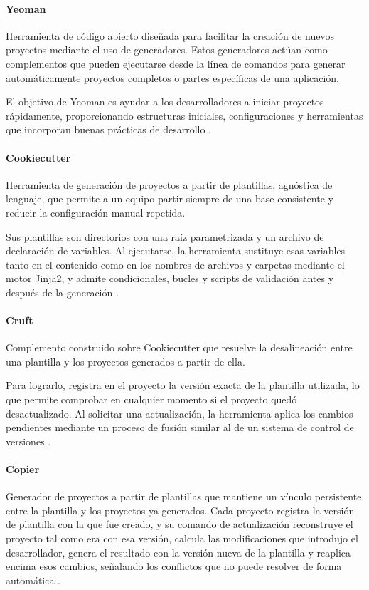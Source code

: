 \paragraph*{Yeoman}
Herramienta de código abierto diseñada para facilitar la creación de nuevos proyectos mediante el uso de generadores. Estos generadores actúan como complementos que pueden ejecutarse desde la línea de comandos para generar automáticamente proyectos completos o partes específicas de una aplicación.

El objetivo de Yeoman es ayudar a los desarrolladores a iniciar proyectos rápidamente, proporcionando estructuras iniciales, configuraciones y herramientas que incorporan buenas prácticas de desarrollo \citep{yeoman-2026}.
\paragraph*{Cookiecutter}
Herramienta de generación de proyectos a partir de plantillas, agnóstica de lenguaje, que permite a un equipo partir siempre de una base consistente y reducir la configuración manual repetida. 
    
Sus plantillas son directorios con una raíz parametrizada y un archivo de declaración de variables. Al ejecutarse, la herramienta sustituye esas variables tanto en el contenido como en los nombres de archivos y carpetas mediante el motor Jinja2, y admite condicionales, bucles y scripts de validación antes y después de la generación \citep{cookiecutter-2023}.
\paragraph*{Cruft}
Complemento construido sobre Cookiecutter que resuelve la desalineación entre una plantilla y los proyectos generados a partir de ella.
    
Para lograrlo, registra en el proyecto la versión exacta de la plantilla utilizada, lo que permite comprobar en cualquier momento si el proyecto quedó desactualizado. Al solicitar una actualización, la herramienta aplica los cambios pendientes mediante un proceso de fusión similar al de un sistema de control de versiones \citep{cruft-2026}.
\paragraph*{Copier}
Generador de proyectos a partir de plantillas que mantiene un vínculo persistente entre la plantilla y los proyectos ya generados. Cada proyecto registra la versión de plantilla con la que fue creado, y su comando de actualización reconstruye el proyecto tal como era con esa versión, calcula las modificaciones que introdujo el desarrollador, genera el resultado con la versión nueva de la plantilla y reaplica encima esos cambios, señalando los conflictos que no puede resolver de forma automática \citep{copier-2026}.
